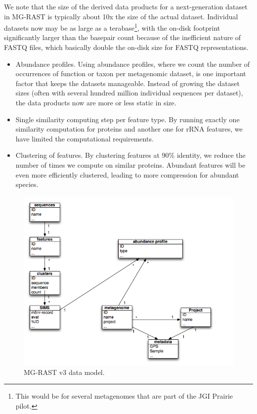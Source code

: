\documentclass[12pt,fullpage]{report}
\begin{document}
We note that the size of the derived data products for a next-generation dataset in MG-RAST is typically about 10x the size of the actual dataset. Individual datasets now may be as large as a terabase\footnote{This would be for several metagenomes that are part of the JGI Prairie pilot.}, with the on-disk footprint significantly larger than the basepair count because of the inefficient nature of FASTQ files, which  basically double the on-disk size for FASTQ representations.

\begin{itemize}
\item Abundance profiles.
Using abundance profiles, where we count the number of occurrences of function or taxon per metagenomic dataset, is one important factor that keeps the datasets manageable. Instead of growing the dataset sizes (often with several hundred million individual sequences per dataset), the data products now are more or less static in size.

\item Single similarity computing step per feature type.
By running exactly one similarity computation for proteins and another one for \gls{rRNA} features, we have limited the computational requirements.

\item Clustering of features.
By clustering features at 90\% identity, we reduce the number of times we compute on similar proteins. Abundant features will be even more efficiently clustered, leading to more compression for abundant species.

\end{itemize}

\begin{figure}
\begin{center}
\includegraphics[width=6in]{Images/data-model.png}
\end{center}
\caption{
MG-RAST v3 data model.}
\label{fig:data-model}
\end{figure}
\end{document}
